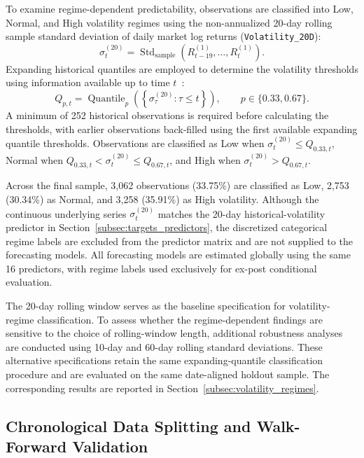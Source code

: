 \documentclass[runningheads,orivec]{llncs}
\begin{document}
To examine regime-dependent predictability, observations are classified into Low, Normal, and High volatility regimes using the non-annualized 20-day rolling sample standard deviation of daily market log returns (\texttt{Volatility\_20D}):
\begin{equation}\label{eq:volatility}
\sigma_t^{(20)} = \operatorname{Std}_{\mathrm{sample}}\left(R_{t-19}^{(1)}, \dots, R_t^{(1)}\right).
\end{equation}
Expanding historical quantiles are employed to determine the volatility thresholds using information available up to time $t$~\cite{feng2024}:
\begin{equation}\label{eq:quantiles}
Q_{p,t} = \operatorname{Quantile}_p\left(\left\{\sigma_\tau^{(20)} : \tau \le t\right\}\right), \qquad p \in \{0.33, 0.67\}.
\end{equation}
A minimum of 252 historical observations is required before calculating the thresholds, with earlier observations back-filled using the first available expanding quantile thresholds. Observations are classified as Low when $\sigma_t^{(20)} \le Q_{0.33,t}$, Normal when $Q_{0.33,t} < \sigma_t^{(20)} \le Q_{0.67,t}$, and High when $\sigma_t^{(20)} > Q_{0.67,t}$.

Across the final sample, 3,062 observations (33.75\%) are classified as Low, 2,753 (30.34\%) as Normal, and 3,258 (35.91\%) as High volatility. Although the continuous underlying series $\sigma_t^{(20)}$ matches the 20-day historical-volatility predictor in Section~\ref{subsec:targets_predictors}, the discretized categorical regime labels are excluded from the predictor matrix and are not supplied to the forecasting models. All forecasting models are estimated globally using the same 16 predictors, with regime labels used exclusively for ex-post conditional evaluation.

The 20-day rolling window serves as the baseline specification for volatility-regime classification. To assess whether the regime-dependent findings are sensitive to the choice of rolling-window length, additional robustness analyses are conducted using 10-day and 60-day rolling standard deviations. These alternative specifications retain the same expanding-quantile classification procedure and are evaluated on the same date-aligned holdout sample. The corresponding results are reported in Section~\ref{subsec:volatility_regimes}.

\subsection{Chronological Data Splitting and Walk-Forward Validation}\label{subsec:data_splitting}
\end{document}
